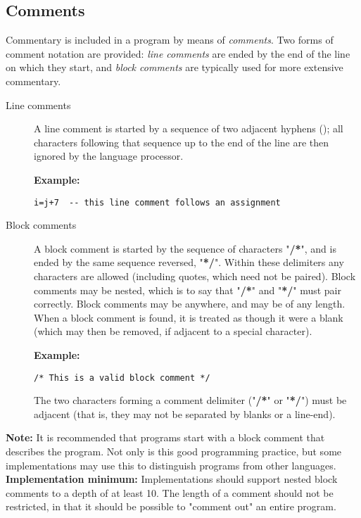 \subsection{Comments}\label{refcomment}
\index{,}
\index{,}
\index{,}
 Commentary is included in a \nr{} program by means of
\emph{comments}.  Two forms of comment notation are provided:
\emph{line comments} are ended by the end of the line on which they
start, and \emph{block comments} are typically used for more extensive
commentary.
\begin{description}
\item[Line comments]\label{reflineco}

A line comment is started by a sequence of two adjacent hyphens
(\doublehyphen{}); all characters following that sequence up to the
end of the line are then ignored by the \nr{} language processor.
 
\textbf{Example:}
\begin{lstlisting}
i=j+7  -- this line comment follows an assignment
\end{lstlisting}
\item[Block comments]\label{refblockco}
 A block comment is started by the sequence of characters
"\textbf{/*}", and is ended by the same sequence reversed,
"\textbf{*/}".
Within these delimiters any characters are allowed (including quotes,
which need not be paired).
Block comments may be nested, which is to say that
"\textbf{/*}" and "\textbf{*/}" must pair correctly.
Block comments may be anywhere, and may be of any length.
When a block comment is found, it is treated as though it were a blank
(which may then be removed, if adjacent to a special character).
 
\textbf{Example:}
\begin{lstlisting}
/* This is a valid block comment */
\end{lstlisting}
The two characters forming a comment delimiter
("\textbf{/*}" or "\textbf{*/}") must be adjacent
(that is, they may not be separated by blanks or a line-end).
\end{description}
\begin{shaded}\noindent
\textbf{Note: }It is recommended that \nr{} programs start with a block comment
that describes the program.
Not only is this good programming practice, but some implementations may
use this to distinguish \nr{} programs from other languages.
 \textbf{Implementation minimum:} Implementations should support
nested block comments to a depth of at least 10.
The length of a comment should not be restricted, in that it should be
possible to "comment out" an entire program.
\end{shaded}\indent
